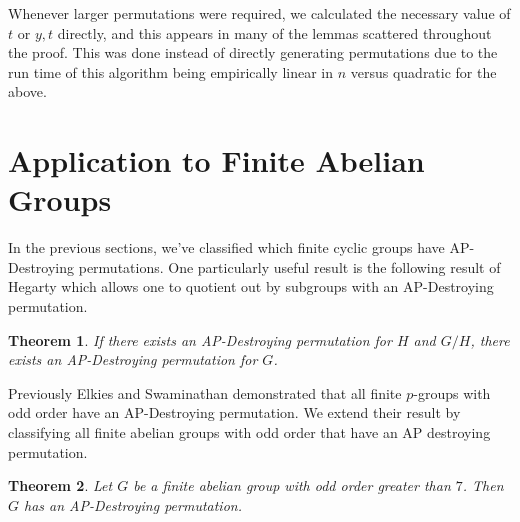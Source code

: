 \documentclass[12pt]{amsart}
\newtheorem{thm}{Theorem}
\theoremstyle{definition}
\theoremstyle{remark}
\begin{document}
Whenever larger permutations were required, we calculated the necessary value of $t$ or $y,t$ directly, and this appears in many of the lemmas scattered throughout the proof. This was done instead of directly generating permutations due to the run time of this algorithm being empirically linear in $n$ versus quadratic for the above.
\section{Application to Finite Abelian Groups}
In the previous sections, we've classified which finite cyclic groups have AP-Destroying permutations. One particularly useful result is the following result of Hegarty which allows one to quotient out by subgroups with an AP-Destroying permutation. 
\begin{thm}\label{Product}
If there exists an AP-Destroying permutation for $H$ and $G/H$, there exists an AP-Destroying permutation for $G$. 
\end{thm}
Previously Elkies and Swaminathan \cite{Ashvin} demonstrated that all finite $p$-groups with odd order have an AP-Destroying permutation. We extend their result by classifying all finite abelian groups with odd order that have an AP destroying permutation.
\begin{thm}
Let $G$ be a finite abelian group with odd order greater than $7$. Then $G$ has an AP-Destroying permutation. 
\end{thm}
\end{document}
